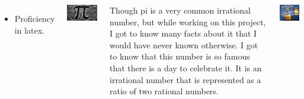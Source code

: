 \documentclass[20pt,margin=1in,innermargin=-4.5in,blockverticalspace=-0.25in]{tikzposter}
\begin{document}
\begin{columns}
{\begin{itemize}
            \item Proficiency in latex.
        \end{itemize}
       \vspace{2cm}
        \begin{tikzfigure}
            \includegraphics[width=0.9\linewidth]{pi_.jpg}
        \end{tikzfigure}
        \vspace{2cm}
        Though pi is a very common irrational number, but while working on this project, I got to know many facts about it that I would have never known otherwise. I got to know that this number is so famous that there is a day to celebrate it. It is an irrational number that is represented as a ratio of two rational numbers.
        \vspace{2cm}
         \begin{tikzfigure}
            \includegraphics[width=0.9\linewidth]{images.jpg}
        \end{tikzfigure}
    }

\end{columns}
\end{document}
